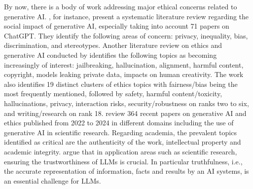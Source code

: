 

By now, there is a body of work addressing major ethical concerns related to generative AI. %
\citet{baldassarre2023social}, for instance, present a systematic literature review regarding the social impact of generative AI, especially taking into account 71 papers on ChatGPT. They identify the following areas of concern: privacy, inequality, bias, discrimination, and stereotypes. Another literature review on ethics and generative AI conducted by %
\citet{hagendorff2024mapping} identifies the following topics as becoming increasingly of interest: jailbreaking, hallucination, alignment, harmful content, copyright, models leaking private data, impacts on human creativity. The work also identifies 19 distinct clusters of ethics topics with fairness/bias being the most frequently mentioned, followed by safety, harmful content/toxicity, hallucinations, privacy, interaction risks, security/robustness on ranks two to six, and writing/research on rank 18. 
\citet{ali2024ethical} review 364 recent papers on generative AI and ethics published from 2022 to 2024 in different domains including the use of generative AI in scientific research. Regarding academia, the prevalent topics identified as critical are the authenticity of the work, intellectual property and academic integrity. 
\citet{sun2024trustllm} argue that in application areas such as scientific research, ensuring the trustworthiness of LLMs is crucial. %
In particular truthfulness, i.e., the accurate representation of information, facts and results by an AI systems, is an essential challenge for LLMs. %

